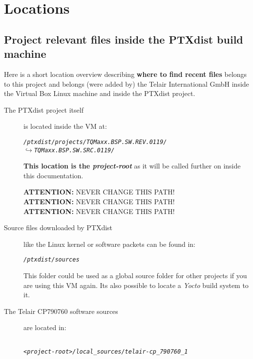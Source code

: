 \chapter{Locations}%
\label{cha:locations}

\section{Project relevant files inside the PTXdist build machine}%
\label{sec:relevant_files}


Here is a short location overview describing \textbf{where to find recent files}
    belongs to this project and belongs (were added by) the Telair International
    GmbH inside the Virtual Box Linux machine and inside the PTXdist project.

\begin{description}

    \item[The PTXdist project itself] is located inside the \gls{VM} at:

        \begin{alltt}
            \textit{/ptxdist/projects/TQMaxx.BSP.SW.REV.0119/
            \qquad\(\hookrightarrow\) TQMaxx.BSP.SW.SRC.0119/}
        \end{alltt}

        \textbf{This location is the \textit{project-root}} as it will be called
        further on inside this documentation.

        \textbf{ATTENTION:} NEVER CHANGE THIS PATH!\@ \\
        \textbf{ATTENTION:} NEVER CHANGE THIS PATH!\@ \\
        \textbf{ATTENTION:} NEVER CHANGE THIS PATH!\@

    \item[Source files downloaded by PTXdist] like the Linux kernel or software
        packets can be found in:

        \begin{alltt}
        \textit{/ptxdist/sources}
        \end{alltt}

        This folder could be
        used as a global source folder for other projects if you are using this
        VM again. Its also possible to locate a \textit{Yocto} build system to
        it.

    \item[The Telair CP790760 software sources] are located in:

        \begin{alltt}~\label{part:location_cp790760_software}
        \textit{<project-root>/local\_sources/telair-cp\_790760\_1 }
        \end{alltt}


\end{description}
